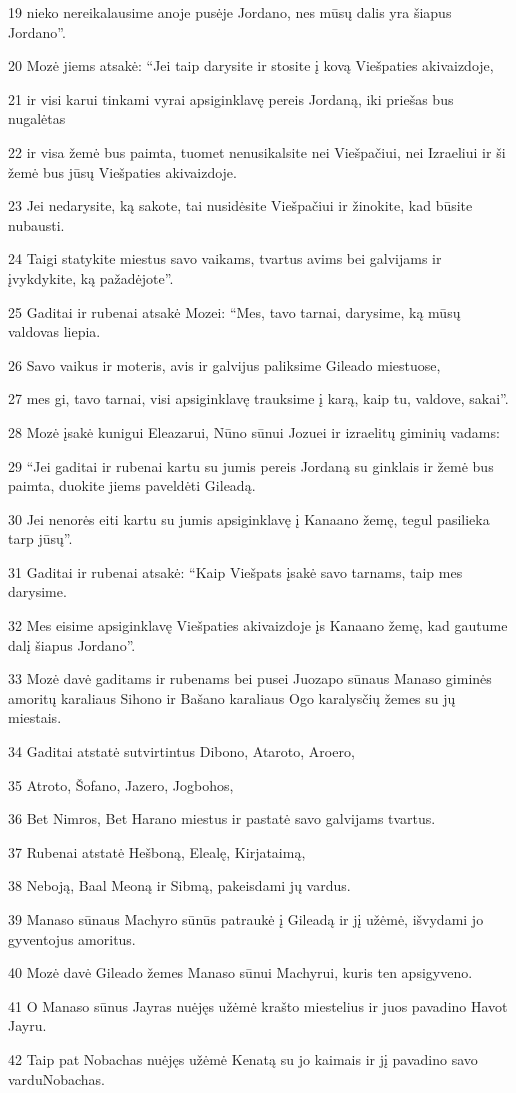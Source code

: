 \par 19 nieko nereikalausime anoje pusėje Jordano, nes mūsų dalis yra šiapus Jordano”. 
\par 20 Mozė jiems atsakė: “Jei taip darysite ir stosite į kovą Viešpaties akivaizdoje, 
\par 21 ir visi karui tinkami vyrai apsiginklavę pereis Jordaną, iki priešas bus nugalėtas 
\par 22 ir visa žemė bus paimta, tuomet nenusikalsite nei Viešpačiui, nei Izraeliui ir ši žemė bus jūsų Viešpaties akivaizdoje. 
\par 23 Jei nedarysite, ką sakote, tai nusidėsite Viešpačiui ir žinokite, kad būsite nubausti. 
\par 24 Taigi statykite miestus savo vaikams, tvartus avims bei galvijams ir įvykdykite, ką pažadėjote”. 
\par 25 Gaditai ir rubenai atsakė Mozei: “Mes, tavo tarnai, darysime, ką mūsų valdovas liepia. 
\par 26 Savo vaikus ir moteris, avis ir galvijus paliksime Gileado miestuose, 
\par 27 mes gi, tavo tarnai, visi apsiginklavę trauksime į karą, kaip tu, valdove, sakai”. 
\par 28 Mozė įsakė kunigui Eleazarui, Nūno sūnui Jozuei ir izraelitų giminių vadams: 
\par 29 “Jei gaditai ir rubenai kartu su jumis pereis Jordaną su ginklais ir žemė bus paimta, duokite jiems paveldėti Gileadą. 
\par 30 Jei nenorės eiti kartu su jumis apsiginklavę į Kanaano žemę, tegul pasilieka tarp jūsų”. 
\par 31 Gaditai ir rubenai atsakė: “Kaip Viešpats įsakė savo tarnams, taip mes darysime. 
\par 32 Mes eisime apsiginklavę Viešpaties akivaizdoje įs Kanaano žemę, kad gautume dalį šiapus Jordano”. 
\par 33 Mozė davė gaditams ir rubenams bei pusei Juozapo sūnaus Manaso giminės amoritų karaliaus Sihono ir Bašano karaliaus Ogo karalysčių žemes su jų miestais. 
\par 34 Gaditai atstatė sutvirtintus Dibono, Ataroto, Aroero, 
\par 35 Atroto, Šofano, Jazero, Jogbohos, 
\par 36 Bet Nimros, Bet Harano miestus ir pastatė savo galvijams tvartus. 
\par 37 Rubenai atstatė Hešboną, Elealę, Kirjataimą, 
\par 38 Neboją, Baal Meoną ir Sibmą, pakeisdami jų vardus. 
\par 39 Manaso sūnaus Machyro sūnūs patraukė į Gileadą ir jį užėmė, išvydami jo gyventojus amoritus. 
\par 40 Mozė davė Gileado žemes Manaso sūnui Machyrui, kuris ten apsigyveno. 
\par 41 O Manaso sūnus Jayras nuėjęs užėmė krašto miestelius ir juos pavadino Havot Jayru. 
\par 42 Taip pat Nobachas nuėjęs užėmė Kenatą su jo kaimais ir jį pavadino savo vardu­Nobachas.



